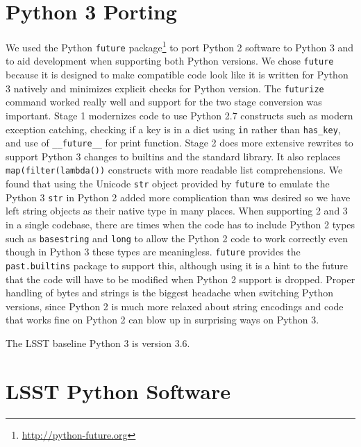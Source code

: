 \documentclass[11pt,twoside]{article}
\begin{document}
\section{Python 3 Porting}

We used the Python \verb|future| package\footnote{\url{http://python-future.org}} to port Python 2 software to Python 3 and to aid development when supporting both Python versions.
We chose \verb|future| because it is designed to make compatible code look like it is written for Python 3 natively and minimizes explicit checks for Python version.
The \verb|futurize| command worked really well and support for the two stage conversion was important.
Stage 1 modernizes code to use Python 2.7 constructs such as modern exception catching, checking if a key is in a dict using \verb|in| rather than \verb|has_key|, and use of \verb|__future__| for print function.
Stage 2 does more extensive rewrites to support Python 3 changes to builtins and the standard library.
It also replaces \verb|map(filter(lambda())| constructs with more readable list comprehensions.
We found that using the Unicode \verb|str| object provided by \verb|future| to emulate the Python 3 \verb|str| in Python 2 added more complication than was desired so we have left string objects as their native type in many places.
When supporting 2 and 3 in a single codebase, there are times when the code has to include Python 2 types such as \texttt{basestring} and \texttt{long} to allow the Python 2 code to work correctly even though in Python 3 these types are meaningless.
\verb|future| provides the \texttt{past.builtins} package to support this, although using it is a hint to the future that the code will have to be modified when Python 2 support is dropped.
Proper handling of bytes and strings is the biggest headache when switching Python versions, since Python 2 is much more relaxed about string encodings and code that works fine on Python 2 can blow up in surprising ways on Python 3.

The LSST baseline Python 3 is version 3.6.

\section{LSST Python Software}
\end{document}
